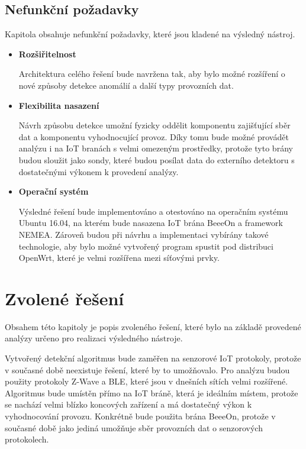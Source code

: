   \subsection{Nefunkční požadavky}
  Kapitola obsahuje nefunkční požadavky, které jsou kladené na výsledný nástroj.
  \begin{itemize}
   \item \textbf{Rozšiřitelnost}
   
   Architektura celého řešení bude navržena tak, aby bylo možné rozšíření o nové 
   způsoby detekce anomálií a další typy provozních dat.
   
   \item \textbf{Flexibilita nasazení}
   
   Návrh způsobu detekce umožní fyzicky oddělit komponentu zajišťující sběr dat a komponentu vyhodnocující 
   provoz. Díky tomu bude možné provádět analýzu i na IoT branách s velmi omezeným prostředky, protože 
   tyto brány budou sloužit jako sondy, které budou posílat data do externího detektoru s dostatečnými 
   výkonem k provedení analýzy. 
   
   \item \textbf{Operační systém}
   
   Výsledné řešení bude implementováno a otestováno na operačním systému Ubuntu 16.04, na kterém 
   bude nasazena IoT brána BeeeOn a framework NEMEA. Zároveň
   budou při návrhu a implementaci vybírány takové technologie, aby bylo možné vytvořený program
   spustit pod distribuci OpenWrt, které je velmi rozšířena mezi síťovými prvky.   
  \end{itemize}

 \newpage 
 \section{Zvolené řešení}
 Obsahem této kapitoly je popis zvoleného řešení, které bylo na základě provedené analýzy
 určeno pro realizaci výsledného nástroje.
 
 Vytvořený detekční algoritmus bude zaměřen na senzorové IoT protokoly, protože v současné době 
 neexistuje řešení, které by to umožňovalo. Pro analýzu budou použity protokoly Z-Wave a BLE, 
 které jsou v dnešních sítích velmi rozšířené. Algoritmus bude umístěn přímo na IoT bráně, která 
 je ideálním místem, protože
 se nachází velmi blízko koncových zařízení a má dostatečný výkon k vyhodnocování provozu. 
 Konkrétně bude použita brána BeeeOn, protože v současné době 
 jako jediná umožňuje sběr provozních dat o senzorových protokolech. 
 
